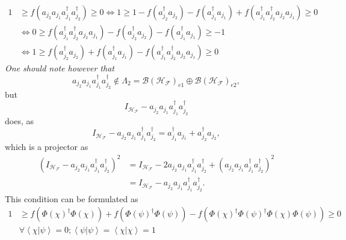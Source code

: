 \documentclass[aps,preprint]{revtex4}%
\begin{document}
\begin{align}
1  &  \geq f\left(  a_{j_{2}}a_{j_{1}}a_{j_{1}}^{\dagger}a_{j_{2}}^{\dagger
}\right)  \geq0\Leftrightarrow1\geq1-f\left(  a_{j_{2}}^{\dagger}a_{j_{2}%
}\right)  -f\left(  a_{j_{1}}^{\dagger}a_{j_{1}}\right)  +f\left(  a_{j_{1}%
}^{\dagger}a_{j_{2}}^{\dagger}a_{j_{2}}a_{j_{1}}\right)  \geq0\nonumber\\
&  \Leftrightarrow0\geq f\left(  a_{j_{1}}^{\dagger}a_{j_{2}}^{\dagger
}a_{j_{2}}a_{j_{1}}\right)  -f\left(  a_{j_{2}}^{\dagger}a_{j_{2}}\right)
-f\left(  a_{j_{1}}^{\dagger}a_{j_{1}}\right)  \geq-1\nonumber\\
&  \Leftrightarrow1\geq f\left(  a_{j_{2}}^{\dagger}a_{j_{2}}\right)
+f\left(  a_{j_{1}}^{\dagger}a_{j_{1}}\right)  -f\left(  a_{j_{1}}^{\dagger
}a_{j_{2}}^{\dagger}a_{j_{2}}a_{j_{1}}\right)  \geq0
\end{align}
\emph{One should note however that}
\begin{equation}
a_{j_{2}}a_{j_{1}}a_{j_{1}}^{\dagger}a_{j_{2}}^{\dagger}\notin\Lambda
_{2}=\mathcal{B}\left(  \mathcal{H}_{\mathcal{F}}\right)  _{e1}\oplus
\mathcal{B}\left(  \mathcal{H}_{\mathcal{F}}\right)  _{e2},
\end{equation}
but
\begin{equation}
I_{\mathcal{H}_{\mathcal{F}}}-a_{j_{2}}a_{j_{1}}a_{j_{1}}^{\dagger}a_{j_{2}%
}^{\dagger}%
\end{equation}
does, as
\begin{equation}
I_{\mathcal{H}_{\mathcal{F}}}-a_{j_{2}}a_{j_{1}}a_{j_{1}}^{\dagger}a_{j_{2}%
}^{\dagger}=a_{j_{1}}^{\dagger}a_{j_{1}}+a_{j_{2}}^{\dagger}a_{j_{2}},
\end{equation}
which is a projector as%
\begin{align}
\left(  I_{\mathcal{H}_{\mathcal{F}}}-a_{j_{2}}a_{j_{1}}a_{j_{1}}^{\dagger
}a_{j_{2}}^{\dagger}\right)  ^{2}  &  =I_{\mathcal{H}_{\mathcal{F}}}%
-2a_{j_{2}}a_{j_{1}}a_{j_{1}}^{\dagger}a_{j_{2}}^{\dagger}+\left(  a_{j_{2}%
}a_{j_{1}}a_{j_{1}}^{\dagger}a_{j_{2}}^{\dagger}\right)  ^{2}\nonumber\\
&  =I_{\mathcal{H}_{\mathcal{F}}}-a_{j_{2}}a_{j_{1}}a_{j_{1}}^{\dagger
}a_{j_{2}}^{\dagger}.
\end{align}
This condition can be formulated as
\begin{align}
1  &  \geq f\left(  \Phi\left(  \chi\right)  ^{\dagger}\Phi\left(
\chi\right)  \right)  +f\left(  \Phi\left(  \psi\right)  ^{\dagger}\Phi\left(
\psi\right)  \right)  -f\left(  \Phi\left(  \chi\right)  ^{\dagger}\Phi\left(
\psi\right)  ^{\dagger}\Phi\left(  \chi\right)  \Phi\left(  \psi\right)
\right)  \geq0\nonumber\\
&  \left.  \forall\right.  \left\langle \chi\left\vert \psi\right.
\right\rangle =0;\left\langle \psi\left\vert \psi\right.  \right\rangle
=\left\langle \chi\left\vert \chi\right.  \right\rangle =1
\end{align}
\end{document}
